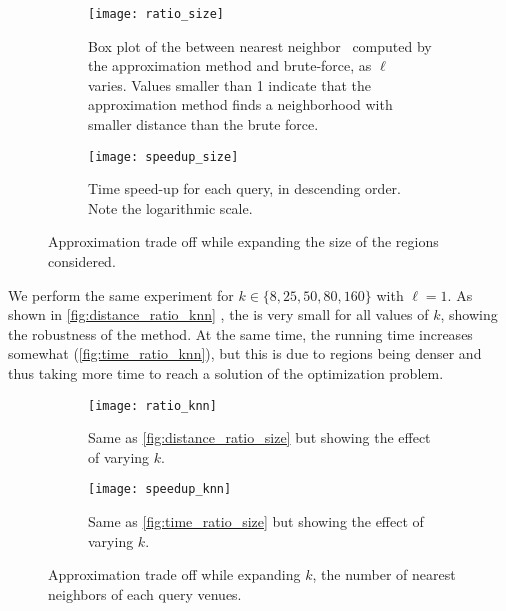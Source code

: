 \begin{figure}[t]
    \begin{subfigure}[b]{\linewidth}
        \centering
        \texttt{[image: ratio\_size]}
		\caption[\Dratio{} as $\ell$ increases]{Box plot of the \Dratio{} between
          nearest neighbor \emd\ computed by the approximation
          method and brute-force, as $\ell$ varies.
          Values smaller than 1 indicate that the approximation method
          finds a neighborhood with smaller distance than the brute force. 
	\label{fig:distance_ratio_size}}
    \end{subfigure}

    \begin{subfigure}[b]{\linewidth}
        \centering
        \texttt{[image: speedup\_size]}
	\caption[Time speed-up as $\ell$ increases]{Time speed-up for each query, in
          descending order. Note the logarithmic scale.\label{fig:time_ratio_size}}
    \end{subfigure}
    \caption[Approximation trade off with respect to $\ell$]{Approximation
    trade off while expanding the size of the regions
    considered.\label{fig:approx_by_size}}
\end{figure}

We perform the same experiment for $k \in \{8, 25, 50, 80, 160\}$ with
$\ell=1$.  As shown in \autoref{fig:distance_ratio_knn}
, the \Dratio{} is very
small for all values of $k$, showing the robustness of the method.  At the same
time, the running time increases somewhat (\autoref{fig:time_ratio_knn}), but
this is due to regions being denser and thus \emd{} taking more time to reach a
solution of the optimization problem.

\begin{figure}[t]
        \centering
    \begin{subfigure}[b]{\linewidth}
        \texttt{[image: ratio\_knn]}
		\caption[\Dratio{} as $k$ increases]{Same as
			\autoref{fig:distance_ratio_size} but showing the effect of varying
			$k$.  \label{fig:distance_ratio_knn}}
    \end{subfigure}

    \begin{subfigure}[b]{\linewidth}
        \centering
        \texttt{[image: speedup\_knn]}
	\caption[Time speed-up as $k$ increases]{Same as
			\autoref{fig:time_ratio_size} but showing the effect of varying
			$k$.\label{fig:time_ratio_knn}}
    \end{subfigure}
    \caption[Approximation trade off with respect to $k$]{Approximation trade
	    off while expanding $k$, the number of nearest neighbors of each
    query venues.\label{fig:approx_by_knn}}
\end{figure}

